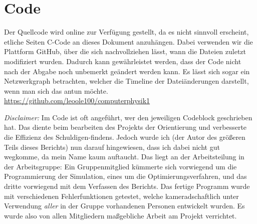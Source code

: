 \appendix

\section{Code}

Der Quellcode wird online zur Verfügung gestellt, da es nicht sinnvoll erscheint, etliche Seiten C-Code an dieses Dokument anzuhängen. Dabei verwenden wir die Plattform GitHub, über die sich nachvollziehen lässt, wann die Dateien zuletzt modifiziert wurden. Dadurch kann gewährleistet werden, dass der Code nicht nach der Abgabe noch unbemerkt geändert werden kann. Es lässt sich sogar ein Netzwerkgraph betrachten, welcher die Timeline der Dateiänderungen darstellt, wenn man sich das antun möchte.\\
\url{https://github.com/leoole100/computerphysik1}
\vspace{1.5cm}

\noindent \textit{Disclaimer:} Im Code ist oft angeführt, wer den jeweiligen Codeblock geschrieben hat. Das diente beim bearbeiten des Projekts der Orientierung und verbesserte die Effizienz des Schuldigen-findens. Jedoch wurde ich (der Autor des größeren Teils dieses Berichts) nun darauf hingewiesen, dass ich dabei nicht gut wegkomme, da mein Name kaum auftaucht. Das liegt an der Arbeitsteilung in der Arbeitsgruppe: Ein Gruppenmitglied kümmerte sich vorwiegend um die Programmierung der Simulation, eines um die Optimierungsverfahren, und das dritte vorwiegend mit dem Verfassen des Berichts. Das fertige Programm wurde mit verschiedenen Fehlerfunktionen getestet, welche kameradschaftlich unter Verwendung \textit{aller} in der Gruppe vorhandenen Personen entwickelt wurden. Es wurde also von allen Mitgliedern maßgebliche Arbeit am Projekt verrichtet.






